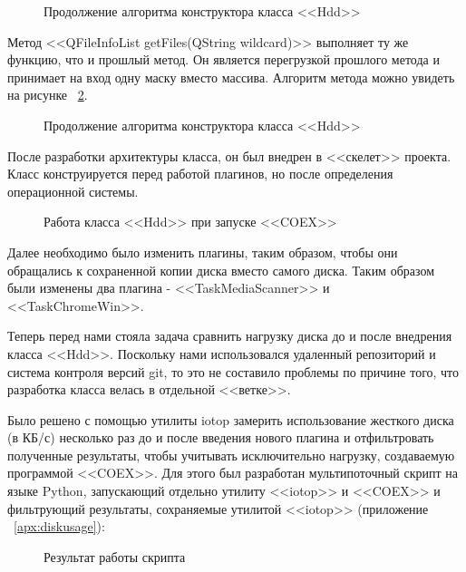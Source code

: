\begin{figure}[!ht]
\caption{ Продолжение алгоритма конструктора класса <<Hdd>> }
\label{bok_9:bok_9}
\end{figure}

Метод <<QFileInfoList getFiles(QString wildcard)>> выполняет ту же функцию, что и прошлый метод. Он является перегрузкой прошлого метода и принимает на вход одну маску вместо массива. Алгоритм метода можно увидеть на рисунке ~\ref{bok_8:bok_8}.

\begin{figure}[!ht]
\caption{ Продолжение алгоритма конструктора класса <<Hdd>> }
\label{bok_8:bok_8}
\end{figure}

После разработки архитектуры класса, он был внедрен в <<скелет>> проекта. Класс конструируется перед работой плагинов, но после определения операционной системы.

\begin{figure}[!ht]
\caption{ Работа класса <<Hdd>> при запуске <<COEX>> }
\label{bok_3:bok_3}
\end{figure}

Далее необходимо было изменить плагины, таким образом, чтобы они обращались к сохраненной копии диска вместо самого диска. Таким образом были изменены два плагина - <<TaskMediaScanner>> и <<TaskChromeWin>>.

Теперь перед нами стояла задача сравнить нагрузку диска до и после внедрения класса <<Hdd>>. Поскольку нами использовался удаленный репозиторий и система контроля версий git, то это не составило проблемы по причине того, что разработка класса велась в отдельной <<ветке>>.

Было решено с помощью утилиты iotop замерить использование жесткого диска (в КБ/с) несколько раз до и после введения нового плагина и отфильтровать полученные результаты, чтобы учитывать исключительно нагрузку, создаваемую программой <<COEX>>. Для этого был разработан мультипоточный скрипт на языке Python, запускающий отдельно утилиту <<iotop>> и <<COEX>> и фильтрующий результаты, сохраняемые утилитой <<iotop>> (приложение ~\ref{apx:diskusage}):

\begin{figure}[!ht]
\caption{ Результат работы скрипта }
\label{bok_4:bok_4}
\end{figure}

